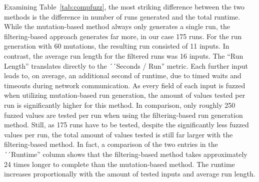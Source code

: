 Examining Table~\ref{tab:compfuzz}, the most striking difference between the two methods is the difference in number of runs generated and the total runtime. While the mutation-based method always only generates a single run, the filtering-based approach generates far more, in our case 175 runs. For the run generation with 60 mutations, the resulting run consisted of 11 inputs. In contrast, the average run length for the filtered runs was 16 inputs. The ``Run Length'' translates directly to the  ´´Seconds / Run'' metric. Each further input leads to, on average, an additional second of runtime, due to timed waits and timeouts during network communication. As every field of each input is fuzzed when utilizing mutation-based run generation, the amount of values tested per run is significantly higher for this method. In comparison, only roughly 250 fuzzed values are tested per run when using the filtering-based run generation method. Still, as 175 runs have to be tested, despite the significantly less fuzzed values per run, the total amount of values tested is still far larger with the filtering-based method. In fact, a comparison of the two entries in the ´´Runtime'' column shows that the filtering-based method takes approximately 24 times longer to complete than the mutation-based method. The runtime increases proportionally with the amount of tested inputs and average run length.